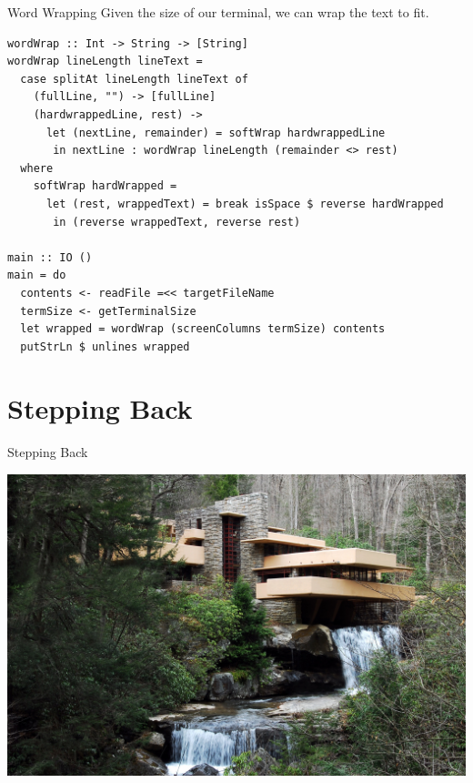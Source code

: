 \documentclass[10pt, presentation, colorlinks]{beamer}
\begin{document}
\begin{frame}[label={sec:org987a0c8},fragile]{Word Wrapping}
 Given the size of our terminal, we can wrap the text to fit.

\pause
\bigskip

\begin{verbatim}
wordWrap :: Int -> String -> [String]
wordWrap lineLength lineText =
  case splitAt lineLength lineText of
    (fullLine, "") -> [fullLine]
    (hardwrappedLine, rest) ->
      let (nextLine, remainder) = softWrap hardwrappedLine
       in nextLine : wordWrap lineLength (remainder <> rest)
  where
    softWrap hardWrapped =
      let (rest, wrappedText) = break isSpace $ reverse hardWrapped
       in (reverse wrappedText, reverse rest)

main :: IO ()
main = do
  contents <- readFile =<< targetFileName
  termSize <- getTerminalSize
  let wrapped = wordWrap (screenColumns termSize) contents
  putStrLn $ unlines wrapped
\end{verbatim}
\end{frame}

\section{Stepping Back}
\label{sec:org1188441}

\begin{frame}[label={sec:orgb4d8e9c}]{Stepping Back}
\begin{center}
\includegraphics[height=0.6\textheight]{./img/architecture.jpg}
\end{center}
\end{frame}
\end{document}
